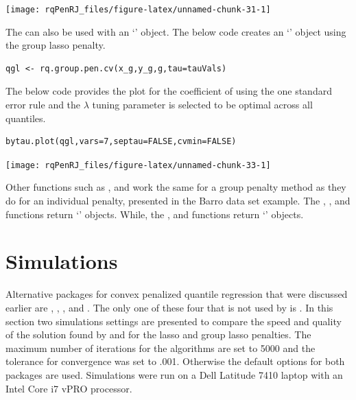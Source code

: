 \begin{center}\texttt{[image: rqPenRJ\_files/figure-latex/unnamed-chunk-31-1]} \end{center}

The  can also be used with an `' object. The below code creates an `' object using the group lasso penalty.

\begin{verbatim}
qgl <- rq.group.pen.cv(x_g,y_g,g,tau=tauVals)
\end{verbatim}

The below code provides the plot for the coefficient of  using the one standard error rule and the \(\lambda\) tuning parameter is selected to be optimal across all quantiles.

\begin{verbatim}
bytau.plot(qgl,vars=7,septau=FALSE,cvmin=FALSE)
\end{verbatim}

\begin{center}\texttt{[image: rqPenRJ\_files/figure-latex/unnamed-chunk-33-1]} \end{center}

Other functions such as ,  and  work the same for a group penalty method as they do for an individual penalty, presented in the Barro data set example. The , , and  functions return `' objects. While, the ,  and  functions return `' objects.

\section{Simulations}\label{simulations}

Alternative packages for convex penalized quantile regression that were discussed earlier are , , , and . The only one of these four that is not used by  is . In this section two simulations settings are presented to compare the speed and quality of the solution found by  and  for the lasso and group lasso penalties. The maximum number of iterations for the algorithms are set to 5000 and the tolerance for convergence was set to .001. Otherwise the default options for both packages are used. Simulations were run on a Dell Latitude 7410 laptop with an Intel Core i7 vPRO processor.

